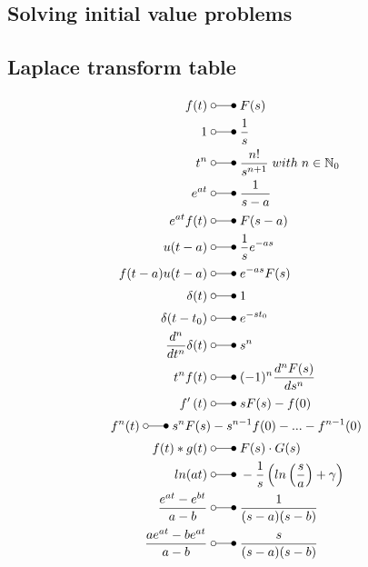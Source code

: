 \subsection{Solving initial value problems}

\subsection{Laplace transform table}
\begin{align*}
    f(t)                            \;&\laplace\; F(s) \\
    1                               \;&\laplace\; \frac{1}{s} \\
    t^{n}                           \;&\laplace\; \frac{n!}{s^{n+1}} \; with \; n \in \mathbb{N}_0 \\
    e^{at}                          \;&\laplace\; \frac{1}{s-a}  \\
    e^{at}f(t)                      \;&\laplace\; F(s-a) \\
    u(t-a)                          \;&\laplace\; \frac{1}{s}e^{-as} \\
    f(t-a)u(t-a)                    \;&\laplace\; e^{-as}F(s) \\
    \delta(t)                       \;&\laplace\; 1\\
    \delta(t-t_{0})                 \;&\laplace\; e^{-st_{0}} \\
    \frac{d^{n}}{dt^{n}}\delta(t)   \;&\laplace\; s^{n}  \\
    t^{n}f(t)                       \;&\laplace\; (-1)^n \frac{d^nF(s)}{ds^n}  \\
    f^{\prime}\left(t\right)        \;&\laplace\; \begin{aligned}sF(s)-f(0)\end{aligned}  \\
    f^{n}(t)                        \; \laplace\; s^nF(s)&-s^{n-1}f(0)-...-f^{n-1}(0)  \\
    f(t)*g(t)                       \;&\laplace\; \begin{aligned}F(s)\cdot G(s)\end{aligned}  \\
    ln(at)                          \;&\laplace\; -\frac{1}{s}\left(ln\left(\frac sa\right)+\gamma\right)  \\ 
    \frac{e^{at}-e^{bt}}{a-b}       \;&\laplace\; \frac{1}{(s-a)(s-b)} \\
    \frac{ae^{at}-be^{at}}{a-b}     \;&\laplace\; \frac{s}{(s-a)(s-b)} \\

\end{align*}
